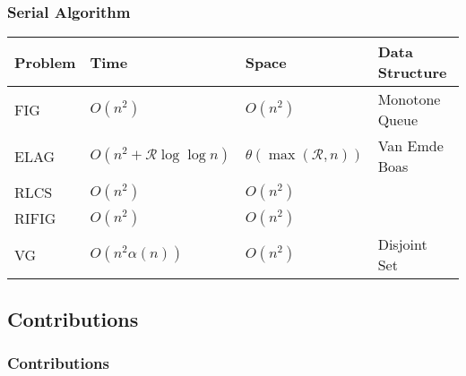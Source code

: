 \begin{frame}
	\frametitle{Serial Algorithm}
	\begin{center}
		\begin{tabular}{| l | l | l | l |}
			\hline
			Problem & Time 	& Space 	& Data Structure \\ \hline
			FIG 	& $O(n^2)$ 				& $O(n^2)$	& Monotone Queue \\ \hline
			ELAG 	& $O(n^2 + \mathcal{R} \log \log n)$ 	& $\theta(\max(\mathcal{R}, n))$ & Van Emde Boas\\ \hline
			RLCS 	& $O(n^2)$ 				& $O(n^2)$	& \\ \hline
			RIFIG 	& $O(n^2)$ 				& $O(n^2)$	& \\ \hline
			VG 		& $O(n^2 \alpha(n))$ 	& $O(n^2)$ 	& Disjoint Set\\ \hline
		\end{tabular}
	\end{center}
\end{frame}

\subsection{Contributions}
\begin{frame}
    \frametitle{Contributions}
\end{frame}
